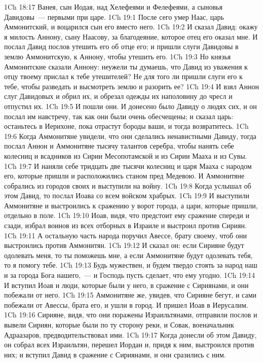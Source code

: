 \vs 1Ch 18:17 Ванея, сын Иодая, над Хелефеями и Фелефеями, а сыновья Давидовы~--- первыми при царе.
\vs 1Ch 19:1 После сего умер Наас, царь Аммонитский, и воцарился сын его вместо него.
\vs 1Ch 19:2 И сказал Давид: окажу я милость Аннону, сыну Наасову, за благодеяние, которое отец его оказал мне. И послал Давид послов утешить его об отце его; и пришли слуги Давидовы в землю Аммонитскую, к Аннону, чтобы утешить его.
\vs 1Ch 19:3 Но князья Аммонитские сказали Аннону: неужели ты думаешь, что Давид из уважения к отцу твоему прислал к тебе утешителей? Не для того ли пришли слуги его к тебе, чтобы разведать и высмотреть землю и разорить ее?
\vs 1Ch 19:4 И взял Аннон слуг Давидовых и обрил их, и обрезал одежды их наполовину до чресл и отпустил их.
\vs 1Ch 19:5 И пошли они. И донесено было Давиду о людях сих, и он послал им навстречу, так как они были очень обесчещены; и сказал царь: останьтесь в Иерихоне, пока отрастут бороды ваши, и тогда возвратитесь.
\rsbpar\vs 1Ch 19:6 Когда Аммонитяне увидели, что они сделались ненавистными Давиду, тогда послал Аннон и Аммонитяне тысячу талантов серебра, чтобы нанять себе колесниц и всадников из Сирии Месопотамской и из Сирии Мааха и из Сувы.
\vs 1Ch 19:7 И наняли себе тридцать две тысячи колесниц и царя Мааха с народом его, которые пришли и расположились станом пред Медевою. И Аммонитяне собрались из городов своих и выступили на войну.
\rsbpar\vs 1Ch 19:8 Когда услышал об этом Давид, то послал Иоава со всем войском храбрых.
\vs 1Ch 19:9 И выступили Аммонитяне и выстроились к сражению у ворот города, а цари, которые пришли, отдельно в поле.
\vs 1Ch 19:10 Иоав, видя, что предстоит ему сражение спереди и сзади, избрал воинов из всех отборных в Израиле и выстроил  против Сириян.
\vs 1Ch 19:11 А остальную часть народа поручил Авессе, брату своему, чтоб они выстроились против Аммонитян.
\vs 1Ch 19:12 И сказал он: если Сирияне будут одолевать меня, то ты поможешь мне, а если Аммонитяне будут одолевать тебя, то я помогу тебе.
\vs 1Ch 19:13 Будь мужествен, и будем твердо стоять за народ наш и за города Бога нашего,~--- и Господь пусть сделает, что ему угодно.
\vs 1Ch 19:14 И вступил Иоав и люди, которые были у него, в сражение с Сириянами, и они побежали от него.
\vs 1Ch 19:15 Аммонитяне же, увидев, что Сирияне бегут, и сами побежали от Авессы, брата его, и ушли в город. И пришел Иоав в Иерусалим.
\vs 1Ch 19:16 Сирияне, видя, что они поражены Израильтянами, отправили послов и вывели Сириян, которые были по ту сторону реки, и Совак, военачальник Адраазаров, предводительствовал ими.
\vs 1Ch 19:17 Когда донесли об этом Давиду, он собрал всех Израильтян, перешел Иордан и, придя к ним, выстроился против них; и вступил Давид в сражение с Сириянами, и они сразились с ним.
